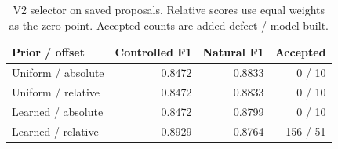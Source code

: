 \begin{table}[t]
\centering
\caption{V2 selector on saved proposals. Relative scores use equal weights as the zero point. Accepted counts are added-defect / model-built.}
\label{tab:math_revision_selector}
\small
\begin{tabular}{lrrr}
\toprule
Prior / offset & Controlled F1 & Natural F1 & Accepted \\
\midrule
Uniform / absolute & 0.8472 & 0.8833 & 0 / 10 \\
Uniform / relative & 0.8472 & 0.8833 & 0 / 10 \\
Learned / absolute & 0.8472 & 0.8799 & 0 / 10 \\
Learned / relative & 0.8929 & 0.8764 & 156 / 51 \\
\bottomrule
\end{tabular}
\end{table}
